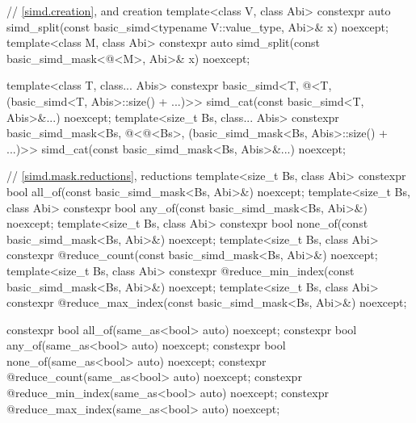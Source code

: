 \begin{codeblock}
{  // \ref{simd.creation},  and  creation
  template<class V, class Abi>
    constexpr auto
      simd_split(const basic_simd<typename V::value_type, Abi>& x) noexcept;
  template<class M, class Abi>
    constexpr auto
      simd_split(const basic_simd_mask<@\maskelementsize@<M>, Abi>& x) noexcept;

  template<class T, class... Abis>
    constexpr basic_simd<T, @\deducet@<T, (basic_simd<T, Abis>::size() + ...)>>
      simd_cat(const basic_simd<T, Abis>&...) noexcept;
  template<size_t Bs, class... Abis>
    constexpr basic_simd_mask<Bs, @\deducet@<@\integerfrom@<Bs>,
                              (basic_simd_mask<Bs, Abis>::size() + ...)>>
      simd_cat(const basic_simd_mask<Bs, Abis>&...) noexcept;

  // \ref{simd.mask.reductions},  reductions
  template<size_t Bs, class Abi>
    constexpr bool all_of(const basic_simd_mask<Bs, Abi>&) noexcept;
  template<size_t Bs, class Abi>
    constexpr bool any_of(const basic_simd_mask<Bs, Abi>&) noexcept;
  template<size_t Bs, class Abi>
    constexpr bool none_of(const basic_simd_mask<Bs, Abi>&) noexcept;
  template<size_t Bs, class Abi>
    constexpr @\simdsizetype@ reduce_count(const basic_simd_mask<Bs, Abi>&) noexcept;
  template<size_t Bs, class Abi>
    constexpr @\simdsizetype@ reduce_min_index(const basic_simd_mask<Bs, Abi>&) noexcept;
  template<size_t Bs, class Abi>
    constexpr @\simdsizetype@ reduce_max_index(const basic_simd_mask<Bs, Abi>&) noexcept;

  constexpr bool all_of(same_as<bool> auto) noexcept;
  constexpr bool any_of(same_as<bool> auto) noexcept;
  constexpr bool none_of(same_as<bool> auto) noexcept;
  constexpr @\simdsizetype@ reduce_count(same_as<bool> auto) noexcept;
  constexpr @\simdsizetype@ reduce_min_index(same_as<bool> auto) noexcept;
  constexpr @\simdsizetype@ reduce_max_index(same_as<bool> auto) noexcept;

}
\end{codeblock}
